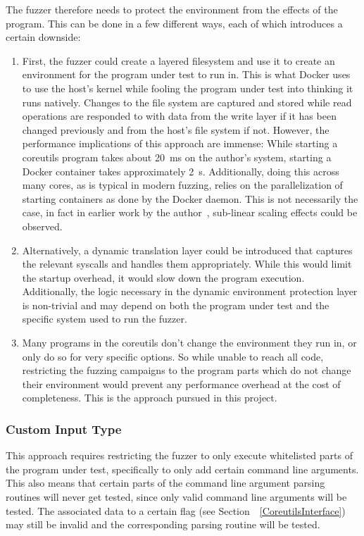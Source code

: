 \documentclass{article}
\let\savedCite=\cite
\renewcommand{\cite}{\unskip~\savedCite}
\let\savedRef=\ref
\renewcommand{\ref}{\unskip~\savedRef}
\begin{document}
\begin{multicols}{2}
    The fuzzer therefore needs to protect the environment from the effects of the program. This can be done in a few different ways, each of which introduces a certain downside:
    \begin{enumerate}
        \item First, the fuzzer could create a layered filesystem and use it to create an environment for the program under test to run in. This is what Docker uses to use the host's kernel while fooling the program under test into thinking it runs natively. Changes to the file system are captured and stored while read operations are responded to with data from the write layer if it has been changed previously and from the host's file system if not. However, the performance implications of this approach are immense: While starting a coreutils program takes about 20~ms on the author's system, starting a Docker container takes approximately 2~s. Additionally, doing this across many cores, as is typical in modern fuzzing, relies on the parallelization of starting containers as done by the Docker daemon. This is not necessarily the case, in fact in earlier work by the author\cite{VT1}, sub-linear scaling effects could be observed.
        \item Alternatively, a dynamic translation layer could be introduced that captures the relevant syscalls and handles them appropriately. While this would limit the startup overhead, it would slow down the program execution. Additionally, the logic necessary in the dynamic environment protection layer is non-trivial and may depend on both the program under test and the specific system used to run the fuzzer.
        \item Many programs in the coreutils don't change the environment they run in, or only do so for very specific options. So while unable to reach all code, restricting the fuzzing campaigns to the program parts which do not change their environment would prevent any performance overhead at the cost of completeness. This is the approach pursued in this project.
    \end{enumerate}

    \subsubsection{Custom Input Type}

    This approach requires restricting the fuzzer to only execute whitelisted parts of the program under test, specifically to only add certain command line arguments. This also means that certain parts of the command line argument parsing routines will never get tested, since only valid command line arguments will be tested. The associated data to a certain flag (see Section~\ref{CoreutilsInterface}) may still be invalid and the corresponding parsing routine will be tested.


\end{multicols}
\end{document}
